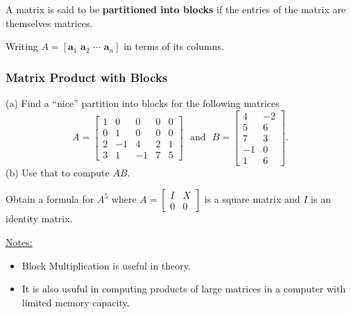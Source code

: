 \documentclass[20pt,a4paper]{extarticle}
\newcounter{example}[section]
\newcounter{definition}[section]
\begin{document}
\begin{definition}
A matrix is said to be \textbf{partitioned into blocks} if the entries of the matrix are themselves matrices.
\end{definition}

\begin{example}
Writing $A = [ \mathbf{a}_1 \,\, \mathbf{a}_2 \,\, \cdots \,\, \mathbf{a}_n]$ in terms of its columns.
\end{example}

\subsubsection{Matrix Product with Blocks}
\begin{example}
(a) Find a ``nice'' partition into blocks for the following matrices
\[
	A = \begin{bmatrix} 
	1 & 0 & 0 & 0 & 0 \\ 0 & 1 & 0 & 0 & 0 \\ 2 & -1 & 4 & 2 & 1 \\ 3 & 1 & -1 & 7 & 5
	\end{bmatrix} 
	\, \, \text{ and } \, \, 
	B= \begin{bmatrix}
	4 & -2 \\ 5 & 6 \\ 7 & 3 \\ -1 & 0 \\ 1 & 6
	\end{bmatrix} .
\]
(b) Use that to compute $AB$. 
\end{example}

\begin{solution}

\end{solution}

\newpage 

\begin{example}
Obtain a formula for $A^5$ where $A = \begin{bmatrix} I & X \\ 0 & 0 \end{bmatrix}$ is a square matrix and $I$ is an identity matrix.
\end{example}

\begin{solution}

\end{solution}

\vfill 

\underline{Notes:}
	\begin{itemize}
		\item Block Multiplication is useful in theory.
		\item It is also usuful in computing products of large matrices in a computer with limited memory capacity.
	\end{itemize}
\end{document}
